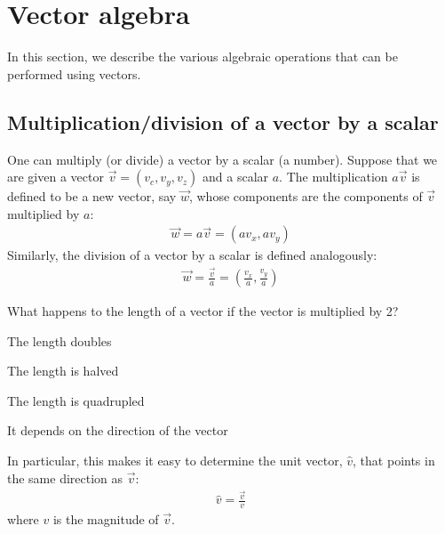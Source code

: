 

\section{Vector algebra}
In this section, we describe the various algebraic operations that can be performed using vectors. 
\subsection{Multiplication/division of a vector by a scalar}
One can multiply (or divide) a vector by a scalar (a number). Suppose that we are given a vector $\vec v=(v_c, v_y, v_z)$ and a scalar $a$. The multiplication $a\vec v$ is defined to be a new vector, say $\vec w$, whose components are the components of $\vec v$ multiplied by $a$:
\begin{align*}
\vec w = a\vec v = (av_x, a v_y)
\end{align*}
Similarly, the division of a vector by a scalar is defined analogously:
\begin{align*}
\vec w = \frac{\vec v}{a} = \left(\frac{v_x}{a}, \frac{v_y}{a}\right)
\end{align*}
\begin{checkpoint}
\begin{MCquestion}
{What happens to the length of a vector if the vector is multiplied by 2?}
\item The length doubles \correct
\item The length is halved
\item The length is quadrupled
\item It depends on the direction of the vector
\end{MCquestion}
\end{checkpoint}

In particular, this makes it easy to determine the unit vector, $\hat v$, that points in the same direction as $\vec v$:
\begin{align*}
\hat v = \frac{\vec v}{v}
\end{align*}
where $v$ is the magnitude of $\vec v$. 

